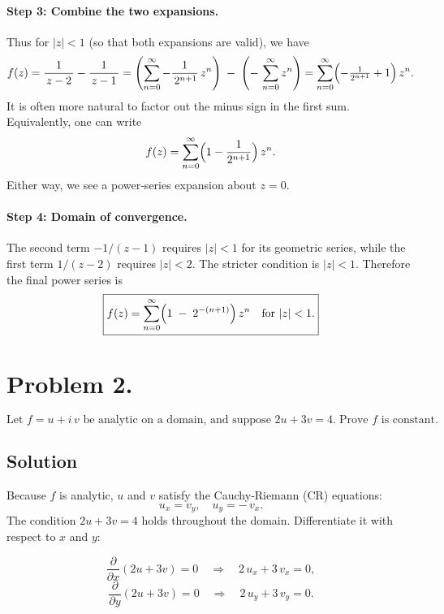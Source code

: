 \documentclass[12pt]{article}
\theoremstyle{definition} %
\theoremstyle{plain} %
\begin{document}
      \paragraph{Step 3: Combine the two expansions.}
      
      Thus for $|z|<1$ (so that both expansions are valid), we have
      \[
      f(z)
      = \frac{1}{\,z-2\,} - \frac{1}{\,z-1\,}
      = \left(\sum_{n=0}^\infty -\frac{1}{\,2^{n+1}}\,z^n\right)
      \;-\;
      \left(-\,\sum_{n=0}^\infty z^n\right)
      =
      \sum_{n=0}^\infty 
      \Bigl(-\tfrac{1}{2^{n+1}} + 1\Bigr) \,z^n.
      \]
      It is often more natural to factor out the minus sign in the first sum.  Equivalently, one can write
      \[
      f(z)
      = \sum_{n=0}^\infty \Bigl(1 - \frac{1}{2^{n+1}}\Bigr)\,z^n.
      \]
      Either way, we see a power‐series expansion about $z=0$.  
      
      \paragraph{Step 4: Domain of convergence.}
      The second term $-1/(z-1)$ requires $|z|<1$ for its geometric series, while the first term $1/(z-2)$ requires $|z|<2$.  The stricter condition is $|z|<1$.  Therefore the final power series is
      \[
      \boxed{
      f(z) 
      = \sum_{n=0}^\infty \Bigl(1 \;-\; 2^{-(n+1)}\Bigr)\,z^n
      \quad\text{for } |z|<1.
      }
      \]
      
      \bigskip
      
      \section*{Problem 2.}
      \[
      \text{Let $f = u + i\,v$ be analytic on a domain, and suppose }2u + 3v = 4.
      \;\text{Prove $f$ is constant.}
      \]
      
      \subsection*{Solution}
      
      Because $f$ is analytic, $u$ and $v$ satisfy the Cauchy‐Riemann (CR) equations:
      \[
      u_x = v_y, 
      \quad
      u_y = -\,v_x.
      \]
      The condition $2u + 3v = 4$ holds throughout the domain.  Differentiate it with respect to $x$ and $y$:
      
      \[
      \frac{\partial}{\partial x}(2u + 3v) = 0 
      \quad\Longrightarrow\quad
      2\,u_x + 3\,v_x = 0,
      \]
      \[
      \frac{\partial}{\partial y}(2u + 3v) = 0 
      \quad\Longrightarrow\quad
      2\,u_y + 3\,v_y = 0.
      \]
      
\end{document}
